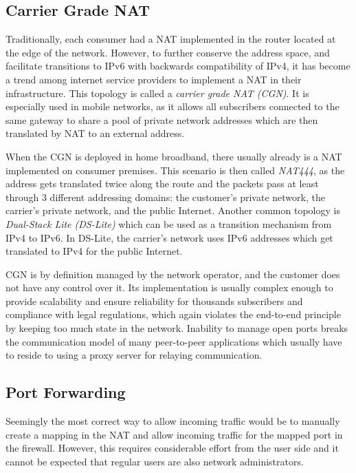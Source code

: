
\subsection{Carrier Grade NAT}

Traditionally, each consumer had a NAT implemented in the router located at the edge of the network. However, to further conserve the address space, and facilitate transitions to IPv6 with backwards compatibility of IPv4, it has become a trend among internet service providers to implement a NAT in their infrastructure. This topology is called a \textit{carrier grade NAT (CGN)}. It is especially used in mobile networks, as it allows all subscribers connected to the same gateway to share a pool of private network addresses which are then translated by NAT to an external address.

When the CGN is deployed in home broadband, there usually already is a NAT implemented on consumer premises. This scenario is then called \textit{NAT444}, as the address gets translated twice along the route and the packets pass at least through 3 different addressing domains: the customer's private network, the carrier's private network, and the public Internet. Another common topology is \textit{Dual-Stack Lite (DS-Lite)} which can be used as a transition mechanism from IPv4 to IPv6. In DS-Lite, the carrier's network uses IPv6 addresses which get translated to IPv4 for the public Internet.

CGN is by definition managed by the network operator, and the customer does not have any control over it. Its implementation is usually complex enough to provide scalability and ensure reliability for thousands subscribers and compliance with legal regulations, which again violates the end-to-end principle by keeping too much state in the network. Inability to manage open ports breaks the communication model of many peer-to-peer applications which usually have to reside to using a proxy server for relaying communication.




\subsection{Port Forwarding}

Seemingly the most correct way to allow incoming traffic would be to manually create a mapping in the NAT and allow incoming traffic for the mapped port in the firewall. However, this requires considerable effort from the user side and it cannot be expected that regular users are also network administrators.

